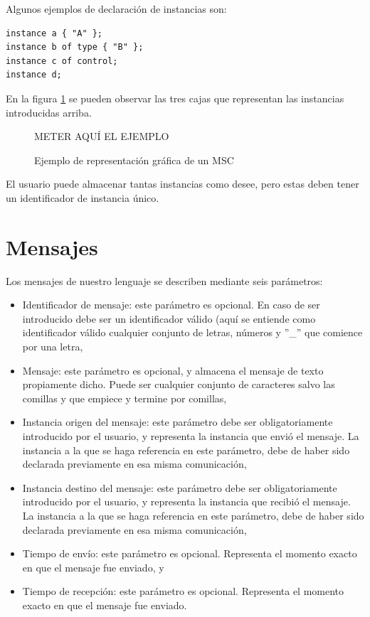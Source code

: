 \documentclass[12pt,a4paper]{report}
\begin{document}
Algunos ejemplos de declaración de instancias son:

\begin{lstlisting}
instance a { "A" };
instance b of type { "B" };
instance c of control;
instance d;
\end{lstlisting}

En la figura \ref{fig:primerejemplo} se pueden observar las tres cajas que representan las instancias introducidas arriba.

\begin{figure}
  \centering
  METER AQUÍ EL EJEMPLO
  \caption{Ejemplo de representación gráfica de un MSC}
  \label{fig:primerejemplo}
\end{figure}

El usuario puede almacenar tantas instancias como desee, pero estas deben tener un identificador de instancia único.

\section{Mensajes}

Los mensajes de nuestro lenguaje se describen mediante seis parámetros:

\begin{itemize}
\item Identificador de mensaje: este parámetro es opcional. En caso de ser introducido debe ser un identificador válido (aquí se entiende como identificador válido cualquier conjunto de letras, números y ''\_'' que comience por una letra,
\item Mensaje: este parámetro es opcional, y almacena el mensaje de texto propiamente dicho. Puede ser cualquier conjunto de caracteres salvo las comillas y que empiece y termine por comillas,
\item Instancia origen del mensaje: este parámetro debe ser obligatoriamente introducido por el usuario, y representa la instancia que envió el mensaje. La instancia a la que se haga referencia en este parámetro, debe de haber sido declarada previamente en esa misma comunicación,
\item Instancia destino del mensaje: este parámetro debe ser obligatoriamente introducido por el usuario, y representa la instancia que recibió el mensaje. La instancia a la que se haga referencia en este parámetro, debe de haber sido declarada previamente en esa misma comunicación,
\item Tiempo de envío: este parámetro es opcional. Representa el momento exacto en que el mensaje fue enviado, y
\item Tiempo de recepción: este parámetro es opcional. Representa el momento exacto en que el mensaje fue enviado.
\end{itemize}
\end{document}
